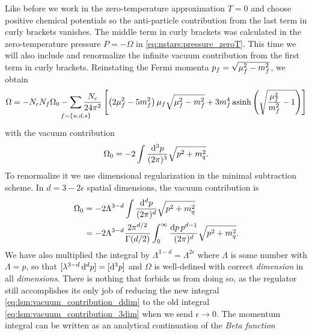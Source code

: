Like before we work in the zero-temperature approximation $T=0$ and choose positive chemical potentials so the anti-particle contribution from the last term in curly brackets vanishes.
The middle term in curly brackets was calculated in the zero-temperature pressure $P=-\Omega$ in \eqref{eq:nstars:pressure_zeroT}.
This time we will also include and renormalize the infinite vacuum contribution from the first term in curly brackets.
Reinstating the Fermi momenta $p_f = \sqrt{\smash[b]{\mu_f^2-m_f^2}}$, we obtain
\begin{equation}
	\Omega = -N_c N_f \Omega_0 - \smashoperator{\sum_{\vphantom{\big|} f=\{u,d,s\}}} \frac{N_c}{24 \pi^2} \left[ \left( 2 \mu_f^2 - 5 m_f^2 \right) \mu_f \sqrt{\mu_f^2 - m_f^2} + 3 m_f^4 \asinh \left( \sqrt{\frac{\mu_{\smash{f}}^2}{m_f^2}-1} \right) \right]
\end{equation}
with the vacuum contribution
\begin{equation}
	\Omega_0 = -2 \int \frac{\mathop{}\!\mathrm{d}^3 p}{(2 \pi)^3} \sqrt{p^2 + m_q^2}.
\label{eq:lsm:vacuum_contribution_3dim}
\end{equation}
To renormalize it we use dimensional regularization in the minimal subtraction scheme.
In $d = 3 - 2 \epsilon$ spatial dimensions, the vacuum contribution is
\begin{equation}
\begin{split}
	\Omega_0 &= -2 \Lambda^{3-d} \int \frac{\mathop{}\!\mathrm{d}^d p}{(2 \pi)^d} \sqrt{p^2 + m_q^2} \\
	         &= -2 \Lambda^{3-d} \frac{2 \pi^{d/2}}{\Gamma(d/2)} \int_0^\infty \frac{\mathop{}\!\mathrm{d} p \, p^{d-1}}{(2 \pi)^d} \sqrt{p^2 + m_q^2} .
\end{split}
\label{eq:lsm:vacuum_contribution_ddim}
\end{equation}
We have also multiplied the integral by $\Lambda^{3-d} = \Lambda^{2\epsilon}$ where $\Lambda$ is some number with $\unit{\Lambda} = \unit{p}$,
so that $[\lambda^{3-d} \mathop{}\!\mathrm{d}^d p] = [\mathop{}\!\mathrm{d}^3 p]$ and $\Omega$ is well-defined with correct \emph{dimension} in all \emph{dimensions}.
There is nothing that forbids us from doing so,
as the regulator still accomplishes its only job of reducing the new integral \eqref{eq:lsm:vacuum_contribution_ddim} to the old integral \eqref{eq:lsm:vacuum_contribution_3dim} when we send $\epsilon \rightarrow 0$.
The momentum integral can be written as an analytical continuation of the \emph{Beta function} \cite{ref:beta_function}
